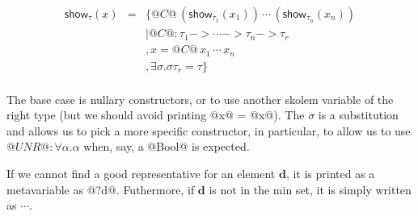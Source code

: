 \[\begin{array}{rcl}
\mathsf{show}_{\tau}(x)
    & = & \{ @C@ \, (\mathsf{show}_{\tau_1}(x_1)) \, \cdots \, (\mathsf{show}_{\tau_n}(x_n)) \\
    &   & \mid @C@ : \tau_1 -> \cdots -> \tau_n -> \tau_r \\
    &   & , x = @C@ \, x_1 \, \cdots \, x_n \\
    &   & , \exists \sigma . \sigma\tau_r = \tau \} \\
\end{array}\]

The base case is nullary constructors, or to use another skolem
variable of the right type (but we should avoid printing @x@ = @x@).
The $\sigma$ is a substitution and allows us to pick a more specific
constructor, in particular, to allow us to use
$@UNR@ : \forall \alpha . \alpha$ when, say, a @Bool@ is expected.

If we cannot find a good representative for an element $\mathbf{d}$,
it is printed as a metavariable as @?d@. Futhermore, if $\mathbf{d}$
is not in the min set, it is simply written as $\cdots$.
